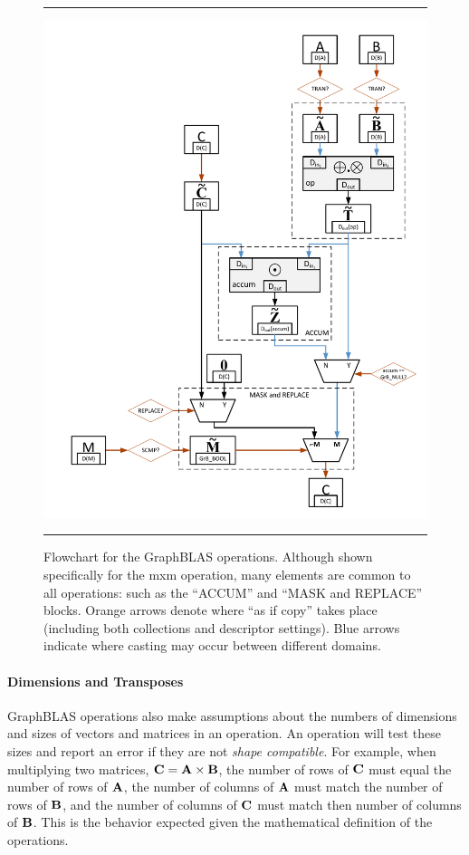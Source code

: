 \begin{figure}
    \hrule
    \begin{center}
        \includegraphics[width=5.5in]{mxm_operation_flowchart_1_1c.pdf}
    \end{center}
    \caption{Flowchart for the GraphBLAS operations. Although shown specifically for
	the {\sf mxm} operation, many elements are common to all operations: such as the ``{\sf ACCUM}'' 
	and ``{\sf MASK and REPLACE}'' blocks.  Orange arrows denote where ``as if copy''
    takes place (including both collections and descriptor settings).  Blue arrows
    indicate where casting may occur between different domains.}
    \label{Fig:mxmFlowchart}
    \hrule
\end{figure}

\paragraph{Dimensions and Transposes}

GraphBLAS operations also make assumptions about the numbers of dimensions and 
sizes of vectors and matrices in an operation.   An operation will test these 
sizes and report an error if they are not \emph{shape compatible}.  For example, when multiplying 
two matrices, ${\bf C} = {\bf A} \times {\bf B}$, the number of rows of 
${\bf C}$ must equal the number of rows of ${\bf A}$, the number of columns 
of ${\bf A}$ must match the number of rows of ${\bf B}$, and the number of 
columns of ${\bf C}$ must match then number of columns of ${\bf B}$.  This 
is the behavior expected given the mathematical definition of the operations.   

